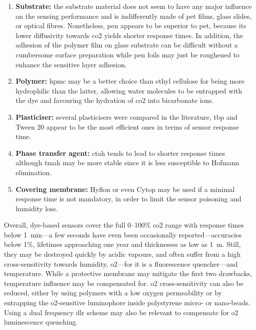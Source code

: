 \begin{enumerate}[leftmargin=*,labelsep=4.9mm]
	\item	\textbf{Substrate:} the substrate material does not seem to have any major influence on the sensing performance and is indifferently made of \gls{pet} films, glass slides, or optical fibres. Nonetheless, \gls{pen} appears to be superior to \gls{pet}, because its lower diffusivity towards \gls{co2} yields shorter response times\cite{fritzsche2017}. In addition, the adhesion of the polymer film on glass substrate can be difficult without a cumbersome surface preparation\cite{cajlakovic2006, dansby2010} while \gls{pen} foils may just be roughened to enhance the sensitive layer adhesion\cite{fritzsche2017}.
	\item	\textbf{Polymer:} \gls{hpmc} may be a better choice than ethyl cellulose for being more hydrophilic than the latter, allowing water molecules to be entrapped with the dye and favouring the hydration of \gls{co2} into bicarbonate ions\cite{aguayolopez2014}.
	\item	\textbf{Plasticiser:} several plasticisers were compared in the literature, \gls{tbp} and Tween 20 appear to be the most efficient ones in terms of sensor response time\cite{wolfbeis1998, aguayolopez2014}.
	\item	\textbf{Phase transfer agent:} \gls{ctah} tends to lead to shorter response times\cite{bultzingslowen2002} although \gls{tmah} may be more stable since it is less susceptible to Hofmann elimination\cite{aguayolopez2014}.
	\item	\textbf{Covering membrane:} Hyflon or even Cytop may be used if a minimal response time is not mandatory, in order to limit the sensor poisoning and humidity loss\cite{fritzsche2017}.
\end{enumerate}

Overall, dye-based sensors cover the full 0--100\% \gls{co2} range with response times below 1~min---a few seconds have even been occasionally reported\cite{amao2005b, chu2008, chu2017}---accuracies below 1\%, lifetimes approaching one year\cite{fernandezramos2018, fernandezramos2019} and thicknesses as low as 1~\textmu{}m\cite{dansby2010}. Still, they may be destroyed quickly by acidic vapours, and often suffer from a high cross-sensitivity towards humidity, \gls{o2}---for it is a fluorescence quencher\cite{kautsky1939, lakowicz1973}---and temperature. While a protective membrane may mitigate the first two drawbacks, temperature influence may be compensated for. \gls{o2} cross-sensitivity can also be reduced, either by using polymers with a low oxygen permeability\cite{perez2009, fernandezramos2018} or by entrapping the \gls{o2}-sensitive luminophore inside polystyrene micro- or nano-beads\cite{huber2000, bultzingslowen2002, cajlakovic2006}. Using a dual frequency \gls{dlr} scheme may also be relevant to compensate for \gls{o2} luminescence quenching\cite{klimant2001_pap}.

